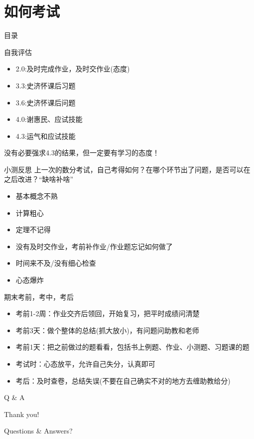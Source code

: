 \documentclass[pdf]{beamer}
\numberwithin{equation}{section}
\theoremstyle{plain}
\theoremstyle{plain}
\theoremstyle{plain}
\theoremstyle{remark}
\begin{document}
\section{如何考试}
\begin{frame}{目录}
\tableofcontents[currentsection]
\end{frame}
\begin{frame}{自我评估}
\begin{itemize}
	\item 2.0:及时完成作业，及时交作业(态度)
	\item 3.3:史济怀课后习题
	\item 3.6:史济怀课后问题
	\item 4.0:谢惠民、应试技能
	\item 4.3:运气和应试技能
\end{itemize}
没有必要强求4.3的结果，但一定要有学习的态度！
\end{frame}
\begin{frame}{小测反思}
上一次的数分考试，自己考得如何？在哪个环节出了问题，是否可以在之后改进？“缺啥补啥”
\begin{itemize}
	\item 基本概念不熟
	\item 计算粗心
	\item 定理不记得
	\item 没有及时交作业，考前补作业/作业题忘记如何做了
	\item 时间来不及/没有细心检查
	\item 心态爆炸
\end{itemize}

\end{frame}
\begin{frame}{期末考前，考中，考后}
\begin{itemize}
	\item 考前1-2周：作业交齐后领回，开始复习，把平时成绩问清楚
	\item 考前3天：做个整体的总结(抓大放小)，有问题问助教和老师
	\item 考前1天：把之前做过的题看看，包括书上例题、作业、小测题、习题课的题
	\item 考试时：心态放平，允许自己失分，认真即可
	\item 考后：及时查卷，总结失误(不要在自己确实不对的地方去缠助教给分)
\end{itemize}

\end{frame}

\begin{frame}{Q \& A}
\begin{center}
	Thank you!
	
	Questions \& Answers?
\end{center}



\end{frame}










\end{document}
